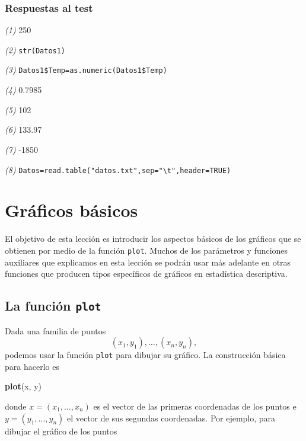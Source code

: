 \documentclass[
]{book}
\newenvironment{Shaded}{\begin{snugshade}}{\end{snugshade}}
\newcommand{\KeywordTok}[1]{\textcolor[rgb]{0.13,0.29,0.53}{\textbf{#1}}}
\newcommand{\NormalTok}[1]{#1}
\theoremstyle{definition}
\theoremstyle{definition}
\theoremstyle{definition}
\theoremstyle{remark}
\begin{document}
\hypertarget{respuestas-al-test-3}{%
\subsection*{Respuestas al test}\label{respuestas-al-test-3}}

\emph{(1)} 250

\emph{(2)} \texttt{str(Datos1)}

\emph{(3)} \texttt{Datos1\$Temp=as.numeric(Datos1\$Temp)}

\emph{(4)} 0.7985

\emph{(5)} 102

\emph{(6)} 133.97

\emph{(7)} -1850

\emph{(8)} \texttt{Datos=read.table("datos.txt",sep="\textbackslash{}t",header=TRUE)}

\hypertarget{chap:plot}{%
\chapter{Gráficos básicos}\label{chap:plot}}

El objetivo de esta lección es introducir los aspectos básicos de los gráficos que se obtienen por medio de la función \texttt{plot}. Muchos de los parámetros y funciones auxiliares que explicamos en esta lección se podrán usar más adelante en otras funciones que producen tipos específicos de gráficos en estadística descriptiva.

\hypertarget{la-funciuxf3n-plot}{%
\section{\texorpdfstring{La función \texttt{plot}}{La función plot}}\label{la-funciuxf3n-plot}}

Dada una familia de puntos
\[
(x_1, y_1), \ldots, (x_n, y_n), 
\]
podemos usar la función \texttt{plot} para dibujar su gráfico. La construcción básica para hacerlo es

\begin{Shaded}
\begin{Highlighting}[]
\KeywordTok{plot}\NormalTok{(x, y)}
\end{Highlighting}
\end{Shaded}

donde \(x=(x_1, \ldots, x_n)\) es el vector de las primeras coordenadas de los puntos e \(y=(y_1, \ldots, y_n)\) el vector de sus segundas coordenadas. Por ejemplo, para dibujar el gráfico de los puntos
\end{document}
